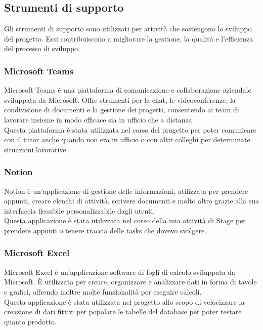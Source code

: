 \subsection{Strumenti di supporto}
Gli strumenti di supporto sono utilizzati per attività che sostengono lo sviluppo del progetto. Essi contribuiscono a migliorare la gestione, la qualità e l'efficienza del processo di sviluppo.\\
 
\subsubsection*{Microsoft Teams}
Microsoft Teams è una piattaforma di comunicazione e collaborazione aziendale sviluppata da Microsoft. Offre strumenti per la chat, le videoconferenze, la condivisione di documenti e la gestione dei progetti, consentendo ai team di lavorare insieme in modo efficace sia in ufficio che a distanza.\\
Questa piattaforma è stata utilizzata nel corso del progetto per poter comunicare con il tutor anche quando non era in ufficio o con altri colleghi per determinate situazioni lavorative.


\subsubsection*{Notion}
Notion è un'applicazione di gestione delle informazioni, utilizzata per prendere appunti, creare elenchi di attività, scrivere documenti e molto altro grazie alla sua interfaccia flessibile personalizzabile dagli utenti.\\
Questa applicazione è stata utilizzata nel corso della mia attività di Stage per prendere appunti o tenere traccia delle tasks che dovevo svolgere.\\ 


\subsubsection*{Microsoft Excel}
Microsoft Excel è un'applicazione software di fogli di calcolo sviluppata da Microsoft. È utilizzata per creare, organizzare e analizzare dati in forma di tavole e grafici, offrendo inoltre molte funzionalità per eseguire calcoli.\\
Questa applicazione è stata utilizzata nel progetto allo scopo di velocizzare la creazione di dati fittizi per popolare le tabelle del database per poter testare quanto prodotto.\\



